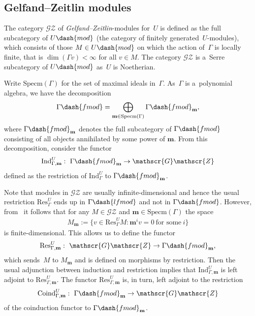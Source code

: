 \subsection{Gelfand--Zeitlin modules}%

The category $\mathscr{G}\mathscr{Z}$ of {\em Gelfand--Zeitlin}-modules for~$U$ is def\/ined as the full subcategory of
$U\dash{mod}$ (the category of f\/initely generated~$U$-modules), which consists of those $M\in U\dash{mod}$ on which the
action of~$\Gamma$ is locally f\/inite, that is $\dim(\Gamma v)<\infty$ for all $v\in M$.
The category $\mathscr{G}\mathscr{Z}$ is a~Serre subcategory of $U\dash{mod}$ as~$U$ is Noetherian.

Write $\mathrm{Specm}(\Gamma)$ for the set of maximal ideals in~$\Gamma$.
As~$\Gamma$ is a~polynomial algebra, we have the decomposition
\begin{gather*}
\Gamma\dash{fmod}=\bigoplus_{\mathbf{m}\in\mathrm{Specm}(\Gamma)} \Gamma\dash{fmod}_{\mathbf{m}},
\end{gather*}
where $\Gamma\dash{fmod}_{\mathbf{m}}$ denotes the full subcategory of $\Gamma\dash{fmod}$ consisting of all objects
annihilated by some power of $\mathbf{m}$.
From this decomposition, consider the functor
\begin{gather*}
\mathrm{Ind}_{\Gamma,\mathbf{m}}^U: \ \Gamma\dash{fmod}_{\mathbf{m}}\to \mathscr{G}\mathscr{Z}
\end{gather*}
def\/ined as the restriction of $\mathrm{Ind}_{\Gamma}^U$ to $\Gamma\dash{fmod}_{\mathbf{m}}$.

Note that modules in $\mathscr{G}\mathscr{Z}$ are usually inf\/inite-dimensional and hence the usual restriction
$\mathrm{Res}_{\Gamma}^U$ ends up in $\Gamma\dash{lfmod}$ and not in $\Gamma\dash{fmod}$.
However, from~\cite[Corollary~5.3(a)]{FuOv2} it follows that for any $M\in \mathscr{G}\mathscr{Z}$ and
$\mathbf{m}\in\mathrm{Specm}(\Gamma)$ the space
\begin{gather*}
M_{\mathbf{m}}:=\big\{v\in \mathrm{Res}_{\Gamma}^U M: \mathbf{m}^iv=0~\text{for some}~i\big\}
\end{gather*}
is f\/inite-dimensional.
This allows us to def\/ine the functor
\begin{gather*}
\mathrm{Res}_{\Gamma,\mathbf{m}}^U: \ \mathscr{G}\mathscr{Z}\to \Gamma\dash{fmod}_{\mathbf{m}},
\end{gather*}
which sends~$M$ to $M_{\mathbf{m}}$ and is def\/ined on morphisms by restriction.
Then the usual adjunction between induction and restriction implies that $\mathrm{Ind}_{\Gamma,\mathbf{m}}^U$ is left
adjoint to $\mathrm{Res}_{\Gamma,\mathbf{m}}^U$.
The functor $\mathrm{Res}_{\Gamma,\mathbf{m}}^U$ is, in turn, left adjoint to the restriction
\begin{gather*}
\mathrm{Coind}_{\Gamma,\mathbf{m}}^U: \ \Gamma\dash{fmod}_{\mathbf{m}}\to \mathscr{G}\mathscr{Z}
\end{gather*}
of the coinduction functor to $\Gamma\dash{fmod}_{\mathbf{m}}$.

